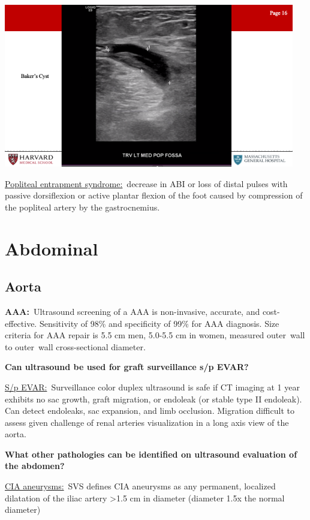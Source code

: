 \documentclass[
]{book}
\begin{document}
\includegraphics[width=5in]{images/vasc_lab/Slide17}

\underline{Popliteal entrapment syndrome:}~decrease in ABI or loss of distal
pulses with passive dorsiflexion or active plantar flexion of the foot
caused by compression of the popliteal artery by the gastrocnemius.

\hypertarget{abdominal}{%
\section{Abdominal}\label{abdominal}}

\hypertarget{aorta}{%
\subsection{Aorta}\label{aorta}}

\textbf{AAA:}~Ultrasound screening of a AAA is non-invasive, accurate, and
cost-effective. Sensitivity of 98\% and specificity of 99\% for AAA
diagnosis. Size criteria for AAA repair is 5.5 cm men, 5.0-5.5 cm in
women, measured outer~wall to outer~wall cross-sectional diameter.

\textbf{Can ultrasound be used for graft surveillance s/p EVAR?}

\underline{S/p EVAR:}~Surveillance color duplex ultrasound is safe if CT
imaging at 1 year exhibits no sac growth, graft migration, or endoleak
(or stable type II endoleak). Can detect endoleaks, sac expansion, and
limb occlusion. Migration difficult to assess given challenge of renal
arteries visualization in a long axis view of the aorta.

\textbf{What other pathologies can be identified on ultrasound evaluation of
the abdomen?}

\underline{CIA aneurysms:}~SVS defines CIA aneurysms as any permanent,
localized dilatation of the iliac artery \textgreater1.5 cm in diameter (diameter
1.5x the normal diameter)
\end{document}
